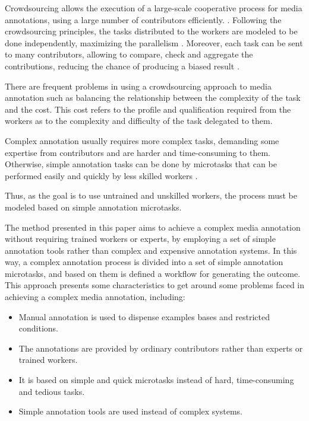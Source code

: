 Crowdsourcing allows the execution of a large-scale cooperative process for media annotations, using a large number of contributors efficiently. \cite{VonAhn:2005:HC:1168246}. Following the crowdsourcing principles, the tasks distributed to the workers are modeled to be done independently, maximizing the parallelism \citep{Howe2006}. Moreover, each task can be sent to many contributors, allowing to compare, check and aggregate the contributions, reducing the chance of producing a biased result \cite{GALTON1907}.

There are frequent problems in using a crowdsourcing approach to media annotation such as balancing the relationship between the complexity of the task and the cost. This cost refers to the profile and qualification required from the workers as to the complexity and difficulty of the task delegated to them.

Complex annotation usually requires more complex tasks, demanding some expertise from contributors and are harder and time-consuming to them. Otherwise, simple annotation tasks can be done by microtasks that can be performed easily and quickly by less skilled workers \cite{Difallah:2015:DMC:2736277.2741685}. 

Thus, as the goal is to use untrained and unskilled workers, the process must be modeled based on simple annotation microtasks.





The method presented in this paper aims to achieve a complex media annotation without requiring trained workers or experts, by employing a set of simple annotation tools rather than complex and expensive annotation systems. In this way, a complex annotation process is divided into a set of simple annotation microtasks, and based on them is defined a workflow for generating the outcome. This approach presents some characteristics to get around some problems faced in achieving a complex media annotation, including:


\begin{itemize}

\item Manual annotation is used to dispense examples bases and restricted conditions.

\item The annotations are provided by ordinary contributors rather than experts or trained workers.

\item It is based on simple and quick microtasks instead of hard, time-consuming and tedious tasks.

\item Simple annotation tools are used instead of complex systems.

\end{itemize}



